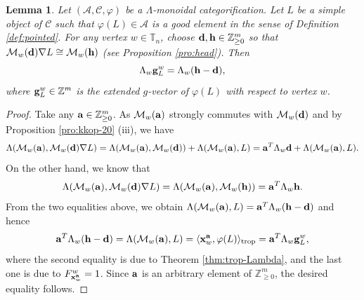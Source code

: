 \documentclass[12pt]{amsart}
\newtheorem{lemma}[theorem]{Lemma}
\theoremstyle{definition}
\theoremstyle{remark}
\numberwithin{equation}{section}
\begin{document}
\begin{lemma}\label{Lem:ng}
Let $(\mathcal{A}, \mathcal{C}, \varphi)$ be a $\mathsf{\Lambda}$-monoidal categorification. Let $L$ be a simple object of $\mathcal{C}$ such that $\varphi(L) \in \mathcal{A}$ is a good element in the sense of Definition \ref{def:pointed}.
 For any vertex $w\in\mathbb T_n$, choose ${\bf d},{\bf h} \in \mathbb{Z}_{\ge 0}^m$ so that $\mathcal{M}_w({\bf d}) \nabla L \cong \mathcal{M}_{w}({\bf h})$ (see Proposition \ref{pro:head}).
 Then 
 \[\Lambda_w {\bf g}_L^w = \Lambda_w({\bf h} - {\bf d}),\] where ${\bf g}_L^w\in\mathbb Z^m$ is the extended $g$-vector of $\varphi(L)$ with respect to vertex $w$.  
\end{lemma}
\begin{proof}
Take any ${\bf a} \in \mathbb{Z}_{\ge 0}^m$. As $\mathcal{M}_w({\bf a})$ strongly commutes with $\mathcal{M}_w({\bf d})$ and by Proposition \ref{pro:kkop-20} (iii), we have
\[ \Lambda(\mathcal{M}_w({\bf a}), \mathcal{M}_w({\bf d}) \nabla L)=\Lambda(\mathcal{M}_w({\bf a}), \mathcal{M}_w({\bf d}))+\Lambda(\mathcal{M}_w({\bf a}),  L)={\bf a}^T\Lambda_w{\bf d}+\Lambda(\mathcal{M}_w({\bf a}),  L).\]
On the other hand, we know that
\[ \Lambda(\mathcal{M}_w({\bf a}), \mathcal{M}_w({\bf d}) \nabla L)=\Lambda(\mathcal{M}_w({\bf a}), \mathcal{M}_w({\bf h}))={\bf a}^T\Lambda_w{\bf h}.\]
From the two equalities above, we obtain $\Lambda(\mathcal{M}_w({\bf a}),  L)={\bf a}^T\Lambda_w({\bf h}-{\bf d})$ and hence
\[{\bf a}^T\Lambda_w({\bf h}-{\bf d})=\Lambda(\mathcal{M}_w({\bf a}),  L) = \langle {\bf x}_w^{\bf a}, \varphi(L) \rangle_{\rm trop}={\bf a}^T\Lambda_w{\bf g}_L^w,
\] 
where the second equality is due to Theorem \ref{thm:trop-Lambda}, and the last one is due to $F_{{\bf x}_w^{\bf a}}^w=1$. Since ${\bf a}$ is an arbitrary element of $\mathbb Z_{\geq 0}^m$, the desired equality follows.
\end{proof}
\end{document}
